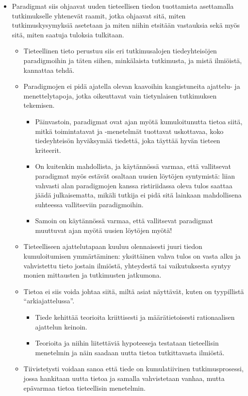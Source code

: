 \documentclass[
]{book}
\providecommand{\tightlist}{%
  \setlength{\itemsep}{0pt}\setlength{\parskip}{0pt}}
\begin{document}
\begin{itemize}
\tightlist
\item
  Paradigmat siis ohjaavat uuden tieteellisen tiedon tuottamista asettamalla tutkimukselle yhtenevät raamit, jotka ohjaavat sitä, miten tutkimuskysymyksiä asetetaan ja miten niihin etsitään vastauksia sekä myös sitä, miten saatuja tuloksia tulkitaan.

  \begin{itemize}
  \tightlist
  \item
    Tieteellinen tieto perustuu siis eri tutkimusalojen tiedeyhteisöjen paradigmoihin ja täten siihen, minkälaista tutkimusta, ja mistä ilmiöistä, kannattaa tehdä.
  \item
    Paradigmojen ei pidä ajatella olevan kaavoihin kangistuneita ajattelu- ja menettelytapoja, jotka oikeuttavat vain tietynlaisen tutkimuksen tekemisen.

    \begin{itemize}
    \tightlist
    \item
      Päinvastoin, paradigmat ovat ajan myötä kumuloitunutta tietoa siitä, mitkä toimintatavat ja -menetelmät tuottavat uskottavaa, koko tiedeyhteisön hyväksymää tiedettä, joka täyttää hyvän tieteen kriteerit.
    \item
      On kuitenkin mahdollista, ja käytännössä varmaa, että vallitsevat paradigmat myös estävät osaltaan uusien löytöjen syntymistä: liian vahvasti alan paradigmojen kanssa ristiriidassa oleva tulos saattaa jäädä julkaisematta, mikäli tutkija ei pidä sitä lainkaan mahdollisena suhteessa vallitseviin paradigmoihin.
    \item
      Samoin on käytännössä varmaa, että vallitsevat paradigmat muuttuvat ajan myötä uusien löytöjen myötä!
    \end{itemize}
  \item
    Tieteelliseen ajattelutapaan kuuluu olennaisesti juuri tiedon kumuloitumisen ymmärtäminen: yksittäinen vahva tulos on vasta alku ja vahvistettu tieto jostain ilmiöstä, yhteydestä tai vaikutuksesta syntyy monien mittausten ja tutkimusten jatkumona.
  \item
    Tietoa ei siis voida johtaa siitä, miltä asiat näyttävät, kuten on tyypillistä ``arkiajattelussa''.

    \begin{itemize}
    \tightlist
    \item
      Tiede kehittää teorioita kriittisesti ja määrätietoisesti rationaalisen ajattelun keinoin.
    \item
      Teorioita ja niihin liitettäviä hypoteeseja testataan tieteellisin menetelmin ja näin saadaan uutta tietoa tutkittavasta ilmiöstä.
    \end{itemize}
  \item
    Tiivistetysti voidaan sanoa että tiede on kumulatiivinen tutkimusprosessi, jossa hankitaan uutta tietoa ja samalla vahvistetaan vanhaa, mutta epävarmaa tietoa tieteellisin menetelmin.


\end{itemize}
\end{itemize}
\end{document}
